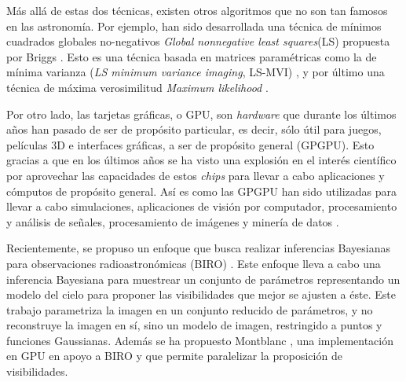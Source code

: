 Más allá de estas dos técnicas, existen otros algoritmos que no son tan famosos en las astronomía. Por ejemplo, han sido desarrollada una técnica de mínimos cuadrados globales no-negativos \textit{Global nonnegative least squares}(LS) propuesta por Briggs \citep{briggs1995}. Esto es una técnica basada en matrices paramétricas como la de mínima varianza (\textit{LS minimum variance imaging}, LS-MVI) \citep{Lesheradioastronomical}, y por último una técnica de máxima verosimilitud \textit{Maximum likelihood} \citep{BenDavid:2008ff}.

Por otro lado, las tarjetas gráficas, o GPU, son \textit{hardware} que durante los últimos años han pasado de ser de propósito particular, es decir, sólo útil para juegos, películas 3D e interfaces gráficas, a ser de propósito general (GPGPU). Esto gracias a que en los últimos años se ha visto una explosión en el interés científico por aprovechar las capacidades de estos \textit{chips} para llevar a cabo aplicaciones y cómputos de propósito general. Así es como las GPGPU han sido utilizadas para llevar a cabo simulaciones, aplicaciones de visión por computador, procesamiento y análisis de señales, procesamiento de imágenes y minería de datos \citep{Owens:2007:ASO}.


Recientemente, se propuso un enfoque que busca realizar inferencias Bayesianas para observaciones radioastronómicas (BIRO) \citep{BIRO}. Este enfoque lleva a cabo una inferencia Bayesiana para muestrear un conjunto de parámetros representando un modelo del cielo para proponer las visibilidades que mejor se ajusten a éste. Este trabajo parametriza la imagen en un conjunto reducido de parámetros, y no reconstruye la imagen en sí, sino un modelo de imagen, restringido a puntos y funciones Gaussianas. Además se ha propuesto Montblanc \citep{montblanc}, una implementación en GPU en apoyo a BIRO y que permite paralelizar la proposición de visibilidades.


